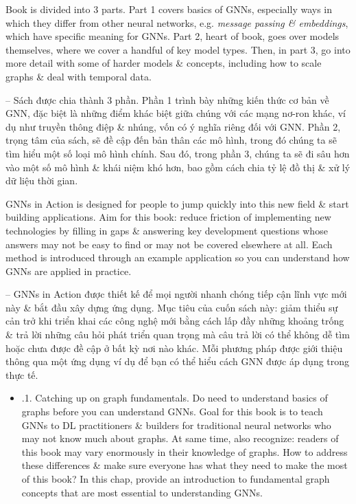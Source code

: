 \documentclass{article}
\begin{document}
\begin{itemize}
\begin{itemize}
        Book is divided into 3 parts. Part 1 covers basics of GNNs, especially ways in which they differ from other neural networks, e.g. {\it message passing \& embeddings}, which have specific meaning for GNNs. Part 2, heart of book, goes over models themselves, where we cover a handful of key model types. Then, in part 3, go into more detail with some of harder models \& concepts, including how to scale graphs \& deal with temporal data.

        -- Sách được chia thành 3 phần. Phần 1 trình bày những kiến thức cơ bản về GNN, đặc biệt là những điểm khác biệt giữa chúng với các mạng nơ-ron khác, ví dụ như {truyền thông điệp \& nhúng}, vốn có ý nghĩa riêng đối với GNN. Phần 2, trọng tâm của sách, sẽ đề cập đến bản thân các mô hình, trong đó chúng ta sẽ tìm hiểu một số loại mô hình chính. Sau đó, trong phần 3, chúng ta sẽ đi sâu hơn vào một số mô hình \& khái niệm khó hơn, bao gồm cách chia tỷ lệ đồ thị \& xử lý dữ liệu thời gian.

        GNNs in Action is designed for people to jump quickly into this new field \& start building applications. Aim for this book: reduce friction of implementing new technologies by filling in gaps \& answering key development questions whose answers may not be easy to find or may not be covered elsewhere at all. Each method is introduced through an example application so you can understand how GNNs are applied in practice.

        -- GNNs in Action được thiết kế để mọi người nhanh chóng tiếp cận lĩnh vực mới này \& bắt đầu xây dựng ứng dụng. Mục tiêu của cuốn sách này: giảm thiểu sự cản trở khi triển khai các công nghệ mới bằng cách lấp đầy những khoảng trống \& trả lời những câu hỏi phát triển quan trọng mà câu trả lời có thể không dễ tìm hoặc chưa được đề cập ở bất kỳ nơi nào khác. Mỗi phương pháp được giới thiệu thông qua một ứng dụng ví dụ để bạn có thể hiểu cách GNN được áp dụng trong thực tế.
        \begin{itemize}
            \item {.1. Catching up on graph fundamentals.} Do need to understand basics of graphs before you can understand GNNs. Goal for this book is to teach GNNs to DL practitioners \& builders for traditional neural networks who may not know much about graphs. At same time, also recognize: readers of this book may vary enormously in their knowledge of graphs. How to address these differences \& make sure everyone has what they need to make the most of this book? In this chap, provide an introduction to fundamental graph concepts that are most essential to understanding GNNs.


\end{itemize}
\end{itemize}
\end{itemize}
\end{document}
